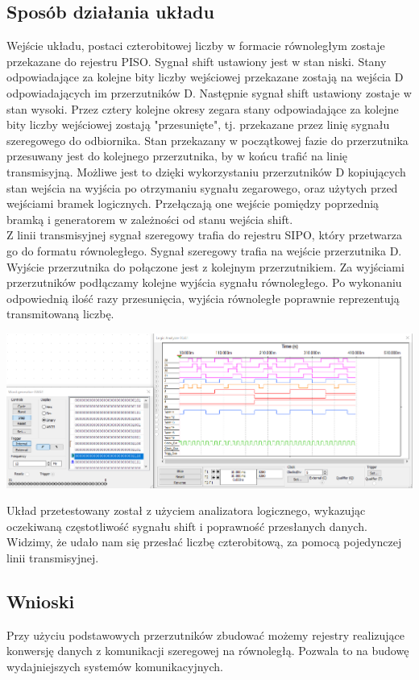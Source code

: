 \documentclass{article}
\begin{document}
        \subsection{Sposób działania układu}
            Wejście układu, postaci czterobitowej liczby w formacie równoległym zostaje przekazane do rejestru PISO. Sygnał shift ustawiony jest w stan niski. Stany odpowiadające za kolejne bity liczby wejściowej przekazane zostają na wejścia D odpowiadających im przerzutników D. Następnie sygnał shift ustawiony zostaje w stan wysoki. Przez cztery kolejne okresy zegara stany odpowiadające za kolejne bity liczby wejściowej zostają "przesunięte", tj. przekazane przez linię sygnału szeregowego do odbiornika. Stan przekazany w początkowej fazie do przerzutnika przesuwany jest do kolejnego przerzutnika, by w końcu trafić na linię transmisyjną.  Możliwe jest to dzięki wykorzystaniu przerzutników D kopiujących stan wejścia na wyjścia po otrzymaniu sygnału zegarowego, oraz użytych przed wejściami bramek logicznych. Przełączają one wejście pomiędzy poprzednią bramką i generatorem w zależności od stanu wejścia shift. \\
            
            Z linii transmisyjnej sygnał szeregowy trafia do rejestru SIPO, który przetwarza go do formatu równoległego. Sygnał szeregowy trafia na wejście przerzutnika D. Wyjście przerzutnika do połączone jest z kolejnym przerzutnikiem. Za wyjściami przerzutników podłączamy kolejne wyjścia sygnału równoległego. Po wykonaniu odpowiednią ilość razy przesunięcia, wyjścia równoległe poprawnie reprezentują transmitowaną liczbę. \\
            
            \begin{center}
                \includegraphics[width=18cm]{reports/img/Z2C_2.png}\\
            \end{center}
            Układ przetestowany został z użyciem analizatora logicznego, wykazując oczekiwaną częstotliwość sygnału shift i poprawność przesłanych danych. Widzimy, że udało nam się przesłać liczbę czterobitową, za pomocą pojedynczej linii transmisyjnej. 
            
        \subsection{Wnioski}
            Przy użyciu podstawowych przerzutników zbudować możemy rejestry realizujące konwersję danych z komunikacji szeregowej na równoległą. Pozwala to na budowę wydajniejszych systemów komunikacyjnych.
\end{document}
